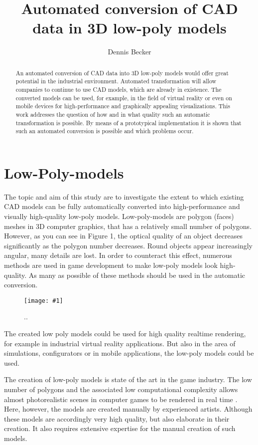 \documentclass[a4paper, 10pt, journal]{wissarbIEEE}      %
\title{\LARGE \bf
Automated conversion of CAD data in 3D low-poly models
}
\author{Dennis Becker}%
\newcommand{\bild}[3]{
\begin{figure}[h]
\centering
  \texttt{[image: \#1]}
  \caption{#3}
  \label{#1}
\end{figure}}
\begin{document}
\maketitle

\begin{abstract}

An automated conversion of CAD data into 3D low-poly models would offer great potential in the industrial environment. Automated transformation will allow companies to continue to use CAD models, which are already in existence. The converted models can be used, for example, in the field of virtual reality or even on mobile devices for high-performance and graphically appealing visualizations. This work addresses the question of how and in what quality such an automatic transformation is possible. By means of a prototypical implementation it is shown that such an automated conversion is possible and which problems occur.

\end{abstract}

\section{Low-Poly-models}
The topic and aim of this study are to investigate the extent to which existing CAD models can be fully automatically converted into high-performance and visually high-quality low-poly models. Low-poly-models are polygon (faces) meshes in 3D computer graphics, that has a relatively small number of polygons. However, as you can see in Figure 1, the optical quality of an object decreases significantly as the polygon number decreases. Round objects appear increasingly angular, many details are lost. In order to counteract this effect, numerous methods are used in game development to make low-poly models look high-quality. As many as possible of these methods should be used in the automatic conversion.

\bild{bilder/b1}{8.5cm}{ .. }

The created low poly models could be used for high quality realtime rendering, for example in industrial virtual reality applications. But also in the area of simulations, configurators or in mobile applications, the low-poly models could be used.

The creation of low-poly models is state of the art in the game industry. The low number of polygons and the associated low computational complexity allows almost photorealistic scenes in computer games to be rendered in real time \cite{unity}.  Here, however, the models are created manually by experienced artists. Although these models are accordingly very high quality, but also elaborate in their creation. It also requires extensive expertise for the manual creation of such models.
\end{document}
